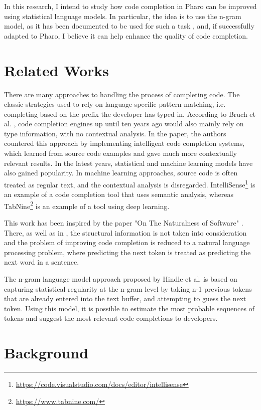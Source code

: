 \documentclass[sigconf,screen]{acmart}
\begin{document}
In this research, I intend to study how code completion in Pharo can be improved using statistical language models. In particular, the idea is to use the n-gram model, as it has been documented to be used for such a task \cite{Hind12a}, and, if successfully adapted to Pharo, I believe it can help enhance the quality of code completion.

\section{Related Works}
There are many approaches to handling the process of completing code. The classic strategies used to rely on language-specific pattern matching, i.e. completing based on the prefix the developer has typed in. According to Bruch et al. \cite{Bruc09a}, code completion engines up until ten years ago would also mainly rely on type information, with no contextual analysis. In the paper, the authors countered this approach by implementing intelligent code completion systems, which learned from source code examples and gave much more contextually relevant results. In the latest years, statistical and machine learning models have also gained popularity. In machine learning approaches, source code is often treated as regular text, and the contextual analysis is disregarded. IntelliSense\footnote{\url{https://code.visualstudio.com/docs/editor/intellisense}} is an example of a code completion tool that uses semantic analysis, whereas TabNine\footnote{\url{https://www.tabnine.com/}} is an example of a tool using deep learning.

This work has been inspired by the paper "On The Naturalness of Software" \cite{Hind12a}. There, as well as in \cite{Tu14a,Rayc14a,Hell17a,Li17a}, the structural information is not taken into consideration and the problem of improving code completion is reduced to a natural language processing problem, where predicting the next token is treated as predicting the next word in a sentence.

The n-gram language model approach proposed by Hindle et al. \cite{Hind12a} is based on capturing statistical regularity at the n-gram level by taking n-1 previous tokens that are already entered into the text buffer, and attempting to guess the next token. Using this model, it is possible to estimate the most probable sequences of tokens and suggest the most relevant code completions to developers.

\section{Background}
\end{document}
